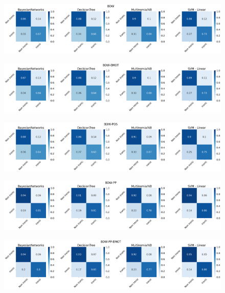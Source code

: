 \documentclass[oneside]{book}
\begin{document}
\begin{figure}[H]
	\centering
	\includegraphics[width=13cm]{assets/reports/conf-matrix/bow/bow.png}
\end{figure}
\vspace*{-0.8cm}

\begin{figure}[H]
	\centering
	\includegraphics[width=13cm]{assets/reports/conf-matrix/bow/bow-emot.png}
\end{figure}
\vspace*{-0.8cm}

\begin{figure}[H]
	\centering
	\includegraphics[width=13cm]{assets/reports/conf-matrix/bow/bow-pos.png}
\end{figure}
\vspace*{-0.8cm}

\begin{figure}[H]
	\centering
	\includegraphics[width=13cm]{assets/reports/conf-matrix/bow/bow-pp.png}
\end{figure}
\vspace*{-0.8cm}

\begin{figure}[H]
	\centering
	\includegraphics[width=13cm]{assets/reports/conf-matrix/bow/bow-pp-emot.png}
\end{figure}
\vspace*{-0.8cm}
\end{document}

